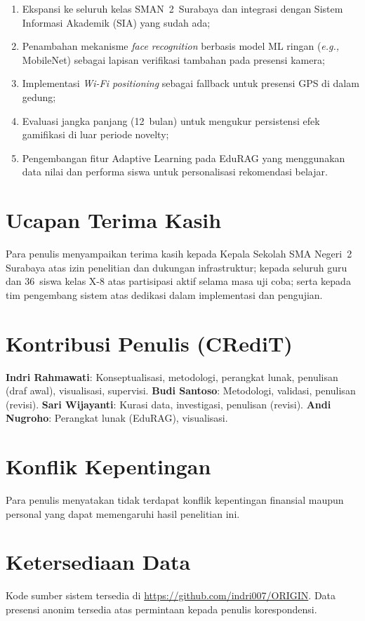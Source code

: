 \documentclass[12pt,a4paper]{article}
\newcommand{\sman}{SMAN~2~Surabaya}
\newcommand{\edurag}{EduRAG}
\begin{document}
\begin{enumerate}
  \item Ekspansi ke seluruh kelas \sman{} dan integrasi dengan
        Sistem Informasi Akademik (SIA) yang sudah ada;
  \item Penambahan mekanisme \textit{face recognition} berbasis
        model ML ringan (\textit{e.g.,} MobileNet) sebagai lapisan
        verifikasi tambahan pada presensi kamera;
  \item Implementasi \textit{Wi-Fi positioning} sebagai fallback
        untuk presensi GPS di dalam gedung;
  \item Evaluasi jangka panjang (12~bulan) untuk mengukur persistensi
        efek gamifikasi di luar periode novelty;
  \item Pengembangan fitur Adaptive Learning pada \edurag{} yang
        menggunakan data nilai dan performa siswa untuk personalisasi
        rekomendasi belajar.
\end{enumerate}

\section*{Ucapan Terima Kasih}
Para penulis menyampaikan terima kasih kepada Kepala Sekolah
SMA Negeri~2 Surabaya atas izin penelitian dan dukungan infrastruktur;
kepada seluruh guru dan 36~siswa kelas X-8 atas partisipasi aktif
selama masa uji coba; serta kepada tim pengembang sistem atas
dedikasi dalam implementasi dan pengujian.

\section*{Kontribusi Penulis (CRediT)}
\textbf{Indri Rahmawati}: Konseptualisasi, metodologi, perangkat lunak,
penulisan (draf awal), visualisasi, supervisi.
\textbf{Budi Santoso}: Metodologi, validasi, penulisan (revisi).
\textbf{Sari Wijayanti}: Kurasi data, investigasi, penulisan (revisi).
\textbf{Andi Nugroho}: Perangkat lunak (\edurag{}), visualisasi.

\section*{Konflik Kepentingan}
Para penulis menyatakan tidak terdapat konflik kepentingan finansial
maupun personal yang dapat memengaruhi hasil penelitian ini.

\section*{Ketersediaan Data}
Kode sumber sistem tersedia di
\url{https://github.com/indri007/ORIGIN}.
Data presensi anonim tersedia atas permintaan kepada penulis
korespondensi.



\end{document}
